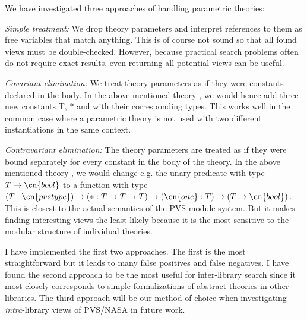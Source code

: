 We have investigated three approaches of handling parametric theories:
\begin{compactenum}
	\item \emph{Simple treatment:} We drop theory parameters and interpret references to them as free variables that match anything.
   This is of course not sound so that all found views must be double-checked.
   However, because practical search problems often do not require exact results, even returning all potential views can be useful.
	\item \emph{Covariant elimination:} We treat theory parameters as if they were constants declared in the body.
	In the above mentioned theory , we would hence add three new constants \cn T, $\ast$ and  with their corresponding types.
  This works well in the common case where a parametric theory is not used with two different instantiations in the same context.
	\item \emph{Contravariant elimination:}
	The theory parameters are treated as if they were bound separately for every constant in the body of the theory.
	In the above mentioned theory , we would change e.g. the unary predicate  with type $T\to\cn{bool}$ to a function with type $(T : \cn{pvstype})\to(\ast : T \to T \to T)\to (\cn{one}:T)\to(T\to\cn{bool})$.
	This is closest to the actual semantics of the PVS module system.
	But it makes finding interesting views the least likely because it is the most sensitive to the modular structure of individual theories.
\end{compactenum}

I have implemented the first two approaches.
The first is the most straightforward but it leads to many false positives and false negatives.
I have found the second approach to be the most useful for inter-library search since it most closely corresponds to simple formalizations of abstract theories in other libraries.
The third approach will be our method of choice when investigating \emph{intra}-library views of PVS/NASA in future work.

